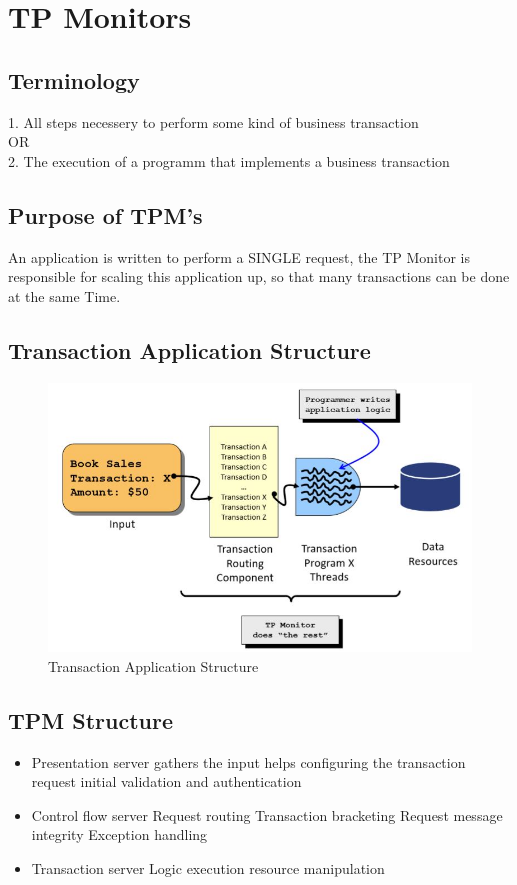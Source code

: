 \chapter{TP Monitors}

	\section{Terminology}
		1. All steps necessery to perform some kind of business transaction\\
		OR\\
		2. The execution of a programm that implements a business transaction
		
	\section{Purpose of TPM's}
		An application is written to perform a SINGLE request, the TP Monitor is responsible for scaling this application up, so that many transactions can be done at the same Time.
		
	
	\section{Transaction Application Structure}
	
		\begin{figure}[h!]
			\includegraphics[scale=0.5]{res/transaction_application_structure.jpg}
			\caption{Transaction Application Structure}
		\end{figure}
	
	\section{TPM Structure}
		\begin{itemize}
			\item Presentation server
				\subitem gathers the input
				\subitem helps configuring the transaction request
				\subitem initial validation and authentication 
			\item Control flow server
				\subitem Request routing
				\subitem Transaction bracketing
				\subitem Request message integrity
				\subitem Exception handling
			\item Transaction server
				\subitem Logic execution
				\subitem resource manipulation
		\end{itemize}
	

